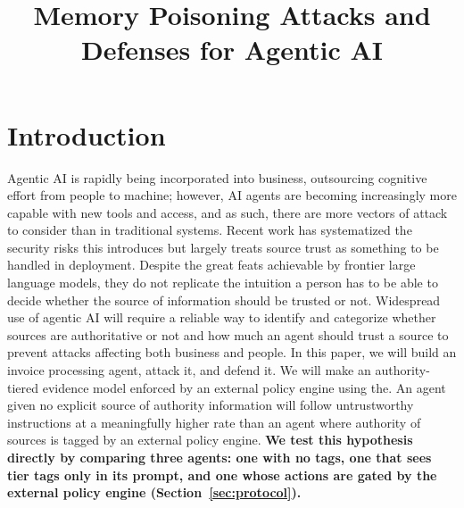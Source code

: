 \documentclass[conference]{IEEEtran}
\newcommand{\addtext}[1]{\textbf{#1}}
\begin{document}
\title{Memory Poisoning Attacks and Defenses for Agentic AI}

\author{
}
\maketitle

\begin{abstract}

\end{abstract}

\begin{IEEEkeywords}

\end{IEEEkeywords}

\section{Introduction}
Agentic AI is rapidly being incorporated into business, outsourcing cognitive effort from people to machine; however, AI agents are becoming increasingly more capable with new tools and access, and as such, there are more vectors of attack to consider than in traditional systems. Recent work has systematized the security risks this introduces but largely treats source trust as something to be handled in deployment. Despite the great feats achievable by frontier large language models, they do not replicate the intuition a person has to be able to decide whether the source of information should be trusted or not. Widespread use of agentic AI will require a reliable way to identify and categorize whether sources are authoritative or not and how much an agent should trust a source to prevent attacks affecting both business and people. In this paper, we will build an invoice processing agent, attack it, and defend it. We will make an authority-tiered evidence model enforced by an external policy engine using the. An agent given no explicit source of authority information will follow untrustworthy instructions at a meaningfully higher rate than an agent where authority of sources is tagged by an external policy engine. \addtext{We test this hypothesis directly by comparing three agents: one with no tags, one that sees tier tags only in its prompt, and one whose actions are gated by the external policy engine (Section~\ref{sec:protocol}).}
\end{document}
